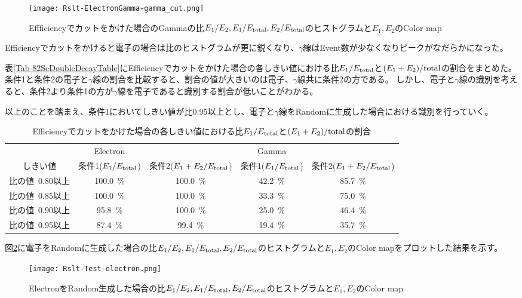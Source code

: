 \documentclass[a4paper,10pt]{jreport}
\begin{document}
\begin{figure}[H]
	\center
	\texttt{[image: Rslt-ElectronGamma-gamma\_cut.png]}
	\caption{Effficiencyでカットをかけた場合のGammaの比$E_1/E_2,E_1/E_{\rm{total}},E_2/E_{\rm{total}}$のヒストグラムと$E_1,E_2$のColor map}
	\label{Rslt-ElectronGamma-gamma_cut}
\end{figure}

Efficiencyでカットをかけると電子の場合は比のヒストグラムが更に鋭くなり、$\gamma$線はEvent数が少なくなりピークがなだらかになった。

表\ref{Tab-82SeDoubleDecayTable}にEfficiencyでカットをかけた場合の各しきい値における比$E_1/E_{\rm{total}}$と$(E_1+E_2)/{\rm{total}}$の割合をまとめた。
条件1と条件2の電子と$\gamma$線の割合を比較すると、割合の値が大きいのは電子、$\gamma$線共に条件2の方である。
しかし、電子と$\gamma$線の識別を考えると、条件2より条件1の方が$\gamma$線を電子であると識別する割合が低いことがわかる。

以上のことを踏まえ、条件1においてしきい値が比0.95以上とし、電子と$\gamma$線をRandomに生成した場合における識別を行っていく。

\begin{table}[H]
	\center
	\caption{Efficiencyでカットをかけた場合の各しきい値における比$E_1/E_{\rm{total}}$と$(E_1+E_2)/{\rm{total}}$の割合} \label{Tab-ElectronGamma_cut}
	\begin{tabular}{|c|cc|cc|}
		\hline
		 & Electron &  & Gamma &  \\
		しきい値 & 条件1($E_1/E_{\rm{total}}$) & 条件2($E_1+E_2/E_{\rm{total}}$) & 条件1($E_1/E_{\rm{total}}$) & 条件2($E_1+E_2/E_{\rm{total}}$)\\
		\hline
		\hline
		比の値\ 0.80以上 & \SI{100.0}{\%} & \SI{100.0}{\%} & \SI{42.2}{\%} & \SI{85.7}{\%} \\
		比の値\ 0.85以上 & \SI{100.0}{\%} & \SI{100.0}{\%} & \SI{33.3}{\%} & \SI{75.0}{\%} \\
		比の値\ 0.90以上 & \SI{95.8}{\%}   & \SI{100.0}{\%} & \SI{25.0}{\%} & \SI{46.4}{\%} \\
		比の値\ 0.95以上 & \SI{87.4}{\%}   & \SI{99.4}{\%}   & \SI{19.4}{\%} & \SI{35.7}{\%} \\
		\hline
	\end{tabular}
\end{table}

図\ref{Rslt-Test-electron}に電子をRandomに生成した場合の比$E_1/E_2,E_1/E_{\rm{total}},E_2/E_{\rm{total}}$のヒストグラムと$E_1,E_2$のColor mapをプロットした結果を示す。

\begin{figure}[H]
	\center
	\texttt{[image: Rslt-Test-electron.png]}
	\caption{ElectronをRandom生成した場合の比$E_1/E_2,E_1/E_{\rm{total}},E_2/E_{\rm{total}}$のヒストグラムと$E_1,E_2$のColor map}
	\label{Rslt-Test-electron}
\end{figure}
\end{document}
